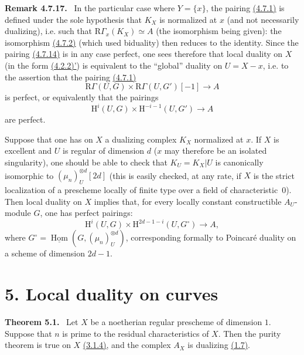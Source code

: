\documentclass[11pt]{article}
\providecommand{\uHom}{\underline{\Hom}}
\newenvironment{statement}[1]{\par\medskip\noindent\textbf{#1.}\ }{\par\medskip}
\renewcommand{\H}{\mathrm{H}}
\DeclareMathOperator{\Hom}{Hom}
\newcommand{\R}{\mathrm{R}}
\providecommand{\Hom}{\operatorname{Hom}}
\providecommand{\R}{\mathrm R}
\providecommand{\Hom}{\operatorname{Hom}}
\begin{document}
\label{sga5:I:remark:4.7.17}\begin{statement}{Remark 4.7.17}
In the particular case where $Y=\{x\}$, the pairing \hyperref[sga5:I:equation:4.7.1]{(4.7.1)} is defined under the sole hypothesis that $K_X$ is normalized at $x$ (and not necessarily dualizing), i.e. such that $\R\Gamma_x(K_X)\simeq A$ (the isomorphism being given): the isomorphism \hyperref[sga5:I:equation:4.7.2]{(4.7.2)} (which used biduality) then reduces to the identity. Since the pairing \hyperref[sga5:I:equation:4.7.14]{(4.7.14)} is in any case perfect, one sees therefore that local duality on $X$ (in the form \hyperref[sga5:I:equation:4.2.2:2]{(4.2.2)'}) is equivalent to the ``global'' duality on $U=X-x$, i.e. to the assertion that the pairing \hyperref[sga5:I:equation:4.7.1]{(4.7.1)}
\[
\R\Gamma(U,G)\times\R\Gamma(U,G')[-1]\longrightarrow A
\]
is perfect, or equivalently that the pairings
\[
\H^i(U,G)\times\H^{-i-1}(U,G')\longrightarrow A
\]
are perfect.

Suppose that one has on $X$ a dualizing complex $K_X$ normalized at $x$. If $X$ is excellent and $U$ is regular of dimension $d$ ($x$ may therefore be an isolated singularity), one should be able to check that $K_U=K_X|U$ is canonically isomorphic to $(\mu_n)_U^{\otimes d}[2d]$ (this is easily checked, at any rate, if $X$ is the strict localization of a prescheme locally of finite type over a field of characteristic~$0$). Then local duality on $X$ implies that, for every locally constant constructible $A_U$-module $G$, one has perfect pairings:
\[
\H^i(U,G)\times\H^{2d-1-i}(U,G^\circ)\longrightarrow A,
\]
where $G^\circ=\uHom(G,(\mu_n)_U^{\otimes d})$, corresponding formally to Poincaré duality on a scheme of dimension $2d-1$.
\end{statement}

\section*{5. Local duality on curves}\label{sga5:I:section:5}

\label{sga5:I:theorem:5.1}\begin{statement}{Theorem 5.1}
Let $X$ be a noetherian regular prescheme of dimension $1$. Suppose that $n$ is prime to the residual characteristics of $X$. Then the purity theorem is true on $X$ \hyperref[sga5:I:statement:3.1.4]{(3.1.4)}, and the complex $A_X$ is dualizing \hyperref[sga5:I:definition:1.7]{(1.7)}.
\end{statement}
\end{document}
